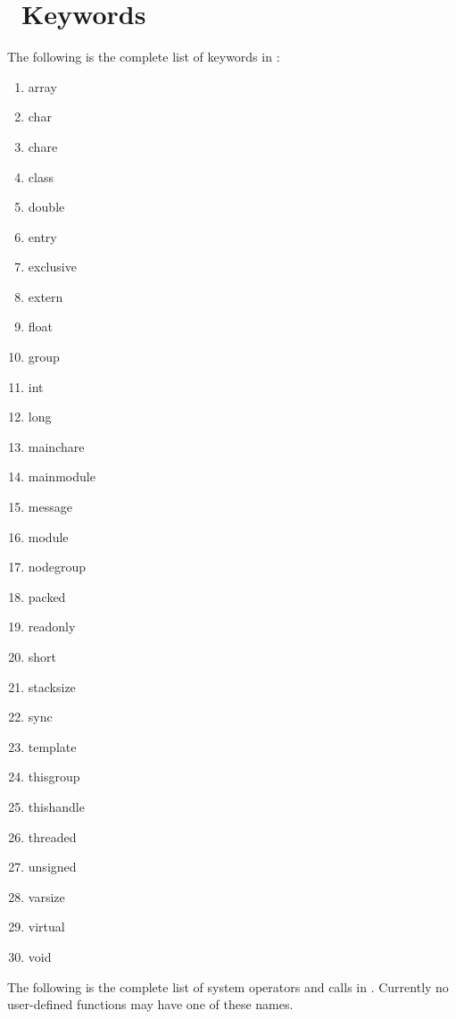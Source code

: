 \chapter{\charmpp\ Keywords}
The following is the complete list of keywords in \charmpp:

\begin{enumerate}
\item array
\item char
\item chare
\item class
\item double
\item entry
\item exclusive
\item extern
\item float
\item group
\item int
\item long
\item mainchare
\item mainmodule
\item message
\item module
\item nodegroup
\item packed
\item readonly
\item short
\item stacksize
\item sync 
\item template
\item thisgroup
\item thishandle
\item threaded
\item unsigned 
\item varsize
\item virtual
\item void
\end{enumerate}

The following is the complete list of system operators and calls in \charmpp.
Currently no user-defined functions may have one of these names.

